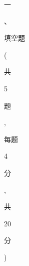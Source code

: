 \documentclass[10pt]{article}
\begin{document}
\begin{CJK}{UTF8}{mj}一\end{CJK}、\begin{CJK}{UTF8}{mj}填空题\end{CJK} (\begin{CJK}{UTF8}{mj}共\end{CJK} 5 \begin{CJK}{UTF8}{mj}题\end{CJK}, \begin{CJK}{UTF8}{mj}每题\end{CJK} 4 \begin{CJK}{UTF8}{mj}分\end{CJK}, \begin{CJK}{UTF8}{mj}共\end{CJK} 20 \begin{CJK}{UTF8}{mj}分\end{CJK})
\end{document}
